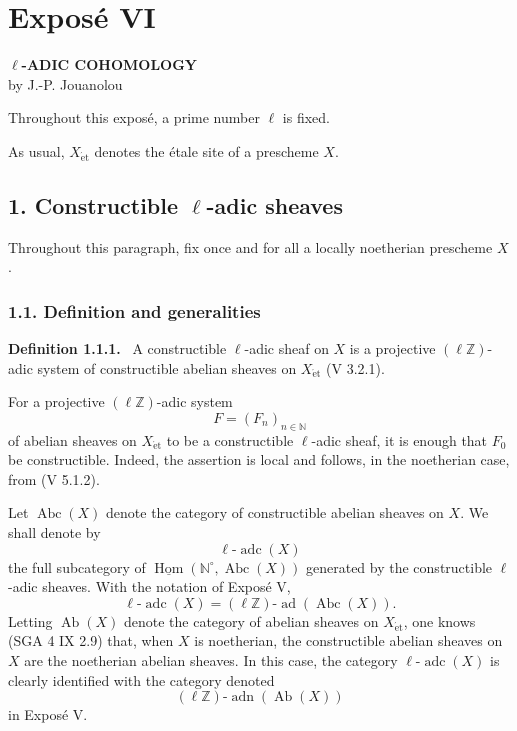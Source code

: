 \documentclass[11pt]{article}
\providecommand{\uHom}{\underline{\Hom}}
\newenvironment{statement}[1]{\par\medskip\noindent\textbf{#1.}\ }{\par\medskip}
\DeclareMathOperator{\Hom}{Hom}
\providecommand{\Hom}{\operatorname{Hom}}
\providecommand{\adn}{\operatorname{adn}}
\providecommand{\Ab}{\operatorname{Ab}}
\providecommand{\Abc}{\operatorname{Abc}}
\providecommand{\adc}{\operatorname{adc}}
\providecommand{\ad}{\operatorname{ad}}
\providecommand{\adn}{\operatorname{adn}}
\providecommand{\Ab}{\operatorname{Ab}}
\providecommand{\Hom}{\operatorname{Hom}}
\begin{document}
\section*{Exposé VI}

\begin{center}
\textbf{\(\ell\)-ADIC COHOMOLOGY}\\[0.5em]
by J.-P. Jouanolou
\end{center}

Throughout this exposé, a prime number \(\ell\) is fixed.

As usual, \(X_{\mathrm{\acute et}}\) denotes the étale site of a prescheme \(X\).

\subsection*{1. Constructible \(\ell\)-adic sheaves}

Throughout this paragraph, fix once and for all a locally noetherian prescheme \(X\).

\subsubsection*{1.1. Definition and generalities}

\begin{statement}{Definition 1.1.1}
A constructible \(\ell\)-adic sheaf on \(X\) is a projective \((\ell\mathbb Z)\)-adic system of constructible abelian sheaves on \(X_{\mathrm{\acute et}}\) (V 3.2.1).
\end{statement}

For a projective \((\ell\mathbb Z)\)-adic system
\[
F=(F_n)_{n\in\mathbb N}
\]
of abelian sheaves on \(X_{\mathrm{\acute et}}\) to be a constructible \(\ell\)-adic sheaf, it is enough that \(F_0\) be constructible. Indeed, the assertion is local and follows, in the noetherian case, from (V 5.1.2).

Let \(\Abc(X)\) denote the category of constructible abelian sheaves on \(X\). We shall denote by
\[
\ell\text{-}\adc(X)
\]
the full subcategory of \(\uHom(\mathbb N^\circ,\Abc(X))\) generated by the constructible \(\ell\)-adic sheaves. With the notation of Exposé V,
\[
\ell\text{-}\adc(X)=(\ell\mathbb Z)\text{-}\ad(\Abc(X)).
\]
Letting \(\Ab(X)\) denote the category of abelian sheaves on \(X_{\mathrm{\acute et}}\), one knows (SGA 4 IX 2.9) that, when \(X\) is noetherian, the constructible abelian sheaves on \(X\) are the noetherian abelian sheaves. In this case, the category \(\ell\text{-}\adc(X)\) is clearly identified with the category denoted
\[
(\ell\mathbb Z)\text{-}\adn(\Ab(X))
\]
in Exposé V.
\end{document}
